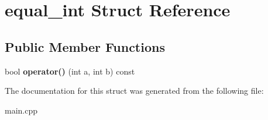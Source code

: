 \hypertarget{structequal__int}{}\section{equal\+\_\+int Struct Reference}
\label{structequal__int}
\subsection*{Public Member Functions}
\begin{DoxyCompactItemize}
\item 
\mbox{\label{structequal__int_a214a64d48c0d25670e656080f3a8d0fb}} 
bool {\bfseries operator()} (int a, int b) const
\end{DoxyCompactItemize}


The documentation for this struct was generated from the following file\+:\begin{DoxyCompactItemize}
\item 
main.\+cpp\end{DoxyCompactItemize}
